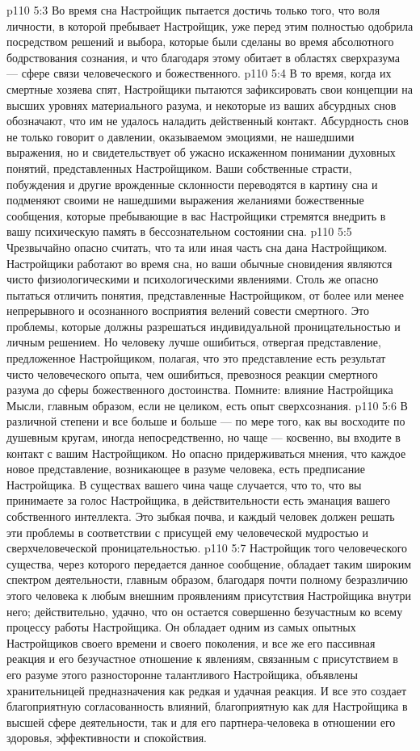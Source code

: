\vs p110 5:3 Во время сна Настройщик пытается достичь только того, что воля личности, в которой пребывает Настройщик, уже перед этим полностью одобрила посредством решений и выбора, которые были сделаны во время абсолютного бодрствования сознания, и что благодаря этому обитает в областях сверхразума --- сфере связи человеческого и божественного.
\vs p110 5:4 В то время, когда их смертные хозяева спят, Настройщики пытаются зафиксировать свои концепции на высших уровнях материального разума, и некоторые из ваших абсурдных снов обозначают, что им не удалось наладить действенный контакт. Абсурдность снов не только говорит о давлении, оказываемом эмоциями, не нашедшими выражения, но и свидетельствует об ужасно искаженном понимании духовных понятий, представленных Настройщиком. Ваши собственные страсти, побуждения и другие врожденные склонности переводятся в картину сна и подменяют своими не нашедшими выражения желаниями божественные сообщения, которые пребывающие в вас Настройщики стремятся внедрить в вашу психическую память в бессознательном состоянии сна.
\vs p110 5:5 Чрезвычайно опасно считать, что та или иная часть сна дана Настройщиком. Настройщики работают во время сна, но ваши обычные сновидения являются чисто физиологическими и психологическими явлениями. Столь же опасно пытаться отличить понятия, представленные Настройщиком, от более или менее непрерывного и осознанного восприятия велений совести смертного. Это проблемы, которые должны разрешаться индивидуальной проницательностью и личным решением. Но человеку лучше ошибиться, отвергая представление, предложенное Настройщиком, полагая, что это представление есть результат чисто человеческого опыта, чем ошибиться, превознося реакции смертного разума до сферы божественного достоинства. Помните: влияние Настройщика Мысли, главным образом, если не целиком, есть опыт сверхсознания.
\vs p110 5:6 В различной степени и все больше и больше --- по мере того, как вы восходите по душевным кругам, иногда непосредственно, но чаще --- косвенно, вы входите в контакт с вашим Настройщиком. Но опасно придерживаться мнения, что каждое новое представление, возникающее в разуме человека, есть предписание Настройщика. В существах вашего чина чаще случается, что то, что вы принимаете за голос Настройщика, в действительности есть эманация вашего собственного интеллекта. Это зыбкая почва, и каждый человек должен решать эти проблемы в соответствии с присущей ему человеческой мудростью и сверхчеловеческой проницательностью.
\vs p110 5:7 \pc Настройщик того человеческого существа, через которого передается данное сообщение, обладает таким широким спектром деятельности, главным образом, благодаря почти полному безразличию этого человека к любым внешним проявлениям присутствия Настройщика внутри него; действительно, удачно, что он остается совершенно безучастным ко всему процессу работы Настройщика. Он обладает одним из самых опытных Настройщиков своего времени и своего поколения, и все же его пассивная реакция и его безучастное отношение к явлениям, связанным с присутствием в его разуме этого разносторонне талантливого Настройщика, объявлены хранительницей предназначения как редкая и удачная реакция. И все это создает благоприятную согласованность влияний, благоприятную как для Настройщика в высшей сфере деятельности, так и для его партнера\hyp{}человека в отношении его здоровья, эффективности и спокойствия.
